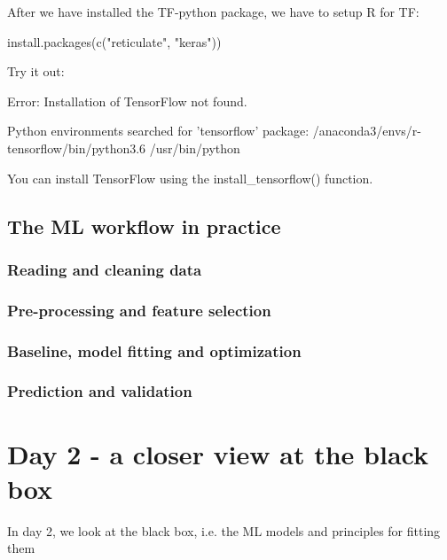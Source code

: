 \documentclass[a4paper,twoside]{tufte-book}\usepackage[]{graphicx}\usepackage[]{color}
\begin{document}
After we have installed the TF-python package, we have to setup R for TF:
\begin{Schunk}
\begin{Sinput}
install.packages(c("reticulate", "keras"))
\end{Sinput}
\end{Schunk}
Try it out:
\begin{Schunk}
\begin{Soutput}
Error: Installation of TensorFlow not found.

Python environments searched for 'tensorflow' package:
 /anaconda3/envs/r-tensorflow/bin/python3.6
 /usr/bin/python

You can install TensorFlow using the install_tensorflow() function.
\end{Soutput}
\end{Schunk}


\section{The ML workflow in practice }

\subsection{Reading and cleaning data}

\subsection{Pre-processing and feature selection}

\subsection{Baseline, model fitting and optimization}

\subsection{Prediction and validation}


\chapter{Day 2 - a closer view at the black box}

In day 2, we look at the black box, i.e. the ML models and principles for fitting them
\end{document}
